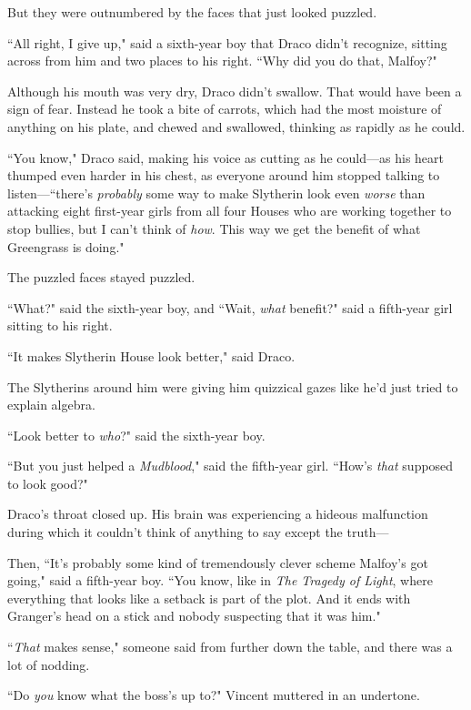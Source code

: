 But they were outnumbered by the faces that just looked puzzled.

``All right, I give up," said a sixth-year boy that Draco didn't recognize, sitting across from him and two places to his right. ``Why did you do that, Malfoy?"

Although his mouth was very dry, Draco didn't swallow. That would have been a sign of fear. Instead he took a bite of carrots, which had the most moisture of anything on his plate, and chewed and swallowed, thinking as rapidly as he could.

``You know," Draco said, making his voice as cutting as he could—as his heart thumped even harder in his chest, as everyone around him stopped talking to listen—``there's \emph{probably} some way to make Slytherin look even \emph{worse} than attacking eight first-year girls from all four Houses who are working together to stop bullies, but I can't think of \emph{how}. This way we get the benefit of what Greengrass is doing."

The puzzled faces stayed puzzled.

``What?" said the sixth-year boy, and ``Wait, \emph{what} benefit?" said a fifth-year girl sitting to his right.

``It makes Slytherin House look better," said Draco.

The Slytherins around him were giving him quizzical gazes like he'd just tried to explain algebra.

``Look better to \emph{who}?" said the sixth-year boy.

``But you just helped a \emph{Mudblood}," said the fifth-year girl. ``How's \emph{that} supposed to look good?"

Draco's throat closed up. His brain was experiencing a hideous malfunction during which it couldn't think of anything to say except the truth—

Then, ``It's probably some kind of tremendously clever scheme Malfoy's got going," said a fifth-year boy. ``You know, like in \emph{The Tragedy of Light}, where everything that looks like a setback is part of the plot. And it ends with Granger's head on a stick and nobody suspecting that it was him."

``\emph{That} makes sense," someone said from further down the table, and there was a lot of nodding.

\later

``Do \emph{you} know what the boss's up to?" Vincent muttered in an undertone.

